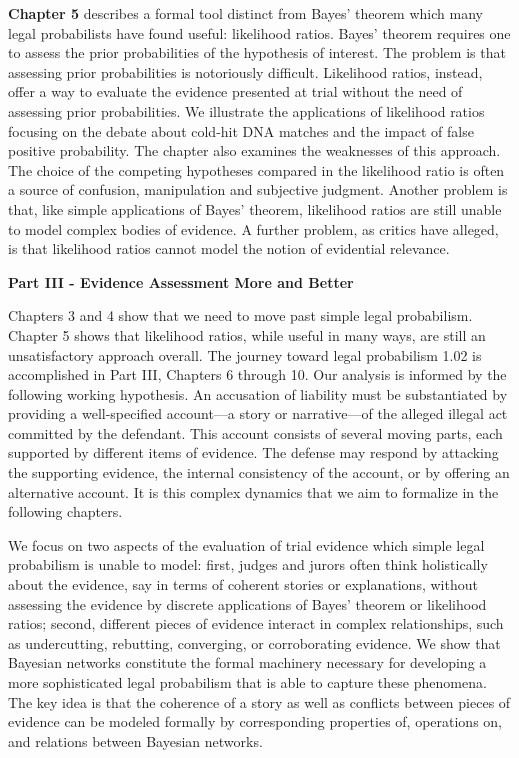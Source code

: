 \documentclass[
  10pt,
  dvipsnames,enabledeprecatedfontcommands]{scrartcl}
\begin{document}
\textbf{Chapter 5} describes a formal tool distinct from Bayes' theorem
which many legal probabilists have found useful: likelihood ratios.
Bayes' theorem requires one to assess the prior probabilities of the
hypothesis of interest. The problem is that assessing prior
probabilities is notoriously difficult. Likelihood ratios, instead,
offer a way to evaluate the evidence presented at trial without the need
of assessing prior probabilities. We illustrate the applications of
likelihood ratios focusing on the debate about cold-hit DNA matches and
the impact of false positive probability. The chapter also examines the
weaknesses of this approach. The choice of the competing hypotheses
compared in the likelihood ratio is often a source of confusion,
manipulation and subjective judgment. Another problem is that, like
simple applications of Bayes' theorem, likelihood ratios are still
unable to model complex bodies of evidence. A further problem, as
critics have alleged, is that likelihood ratios
 cannot model the notion of
evidential relevance.

\vspace{3mm}

\noindent \textbf{Part III - Evidence Assessment More and Better}

\noindent Chapters 3 and 4 show that we need to move past simple legal
probabilism. Chapter 5 shows that likelihood ratios, while useful in
many ways, are still an unsatisfactory approach overall. The journey
toward legal probabilism 1.02 is accomplished in Part III, Chapters 6
through 10. Our analysis is informed by the following working
hypothesis. An accusation of liability must be substantiated by
providing a well-specified account---a story or narrative---of the
alleged illegal act committed by the defendant. This account consists of
several moving parts, each supported by different items of evidence. The
defense may respond by attacking the supporting evidence, the internal
consistency of the account, or by offering an alternative account. It is
this complex dynamics that we aim to formalize in the following
chapters.

We focus on two aspects of the evaluation of trial evidence which simple
legal probabilism is unable to model: first, judges and jurors often
think holistically about the evidence, say in terms of coherent stories
or explanations, without assessing the evidence by discrete applications
of Bayes' theorem or likelihood ratios; second, different pieces of
evidence interact in complex relationships, such as undercutting,
rebutting, converging, or corroborating evidence. We show that Bayesian
networks constitute the formal machinery necessary for developing a more
sophisticated legal probabilism that is able to capture these phenomena.
The key idea is that the coherence of a story as well as conflicts
between pieces of evidence can be modeled formally by corresponding
properties of, operations on, and relations between Bayesian networks.
\end{document}
